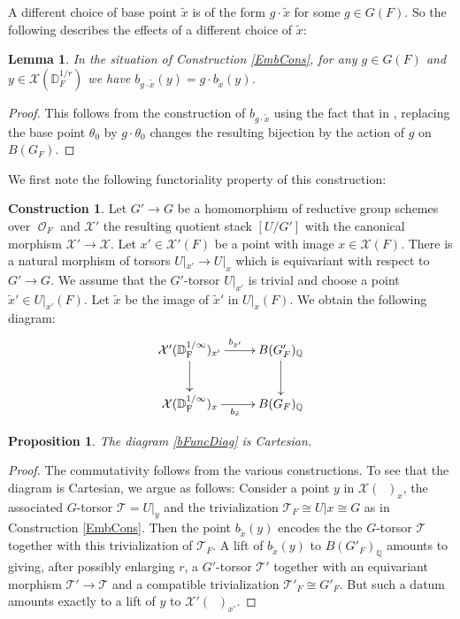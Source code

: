 \documentclass{article}
\DeclareMathOperator{\CO}{\mathcal{O}}
\DeclareMathOperator{\Qb}{\mathbb{Q}}
\newcommand{\CT}{{\mathcal T}}
\newcommand{\CX}{{\mathcal X}}
\newcommand{\Dr}[1][r]{\mathbb{D}_F^{1/#1}}
\DeclareMathOperator{\Dinfty}{\mathbb{D}_F^{1/\infty}}
\theoremstyle{definition}
\newtheorem{construction}[definition]{Construction}
\theoremstyle{plain}
\newtheorem{proposition}[definition]{Proposition}
\newtheorem{lemma}[definition]{Lemma}
\begin{document}
A different choice of base point $\tilde x$ is of the form $g\cdot \tilde x$ for some $g \in G(F)$. So the following describes the effects of a different choice of $\tilde x$:
\begin{lemma} \label{bBP}
   In the situation of Construction \ref{EmbCons}, for any $g \in G(F)$ and $y \in \CX(\Dr)$ we have $b_{g\cdot \tilde x}(y)=g\cdot b_{\tilde x}(y)$. 
\end{lemma}
\begin{proof}
    This follows from the construction of $b_{g \cdot \tilde x}$ using the fact that in \cite[Theorem 4.16]{Ziegler22}, replacing the base point $\theta_0$ by $g\cdot \theta_0$ changes the resulting bijection by the action of $g$ on $B(G_F)$.
\end{proof}
We first note the following functoriality property of this construction:
\begin{construction} \label{bFuncCons}
    Let $G' \to G$ be a homomorphism of reductive group schemes over $\CO_F$ and $\CX'$ the resulting quotient stack $[U/G']$ with the canonical morphism $\CX' \to \CX$. Let $x' \in \CX'(F)$ be a point with image $x \in \CX(F)$. There is a natural morphism of torsors $U|_{x'} \to U|_x$ which is equivariant with respect to $G' \to G$. We assume that the $G'$-torsor $U|_{x'}$ is trivial and choose a point $\tilde x' \in U|_{x'}(F)$. Let $\tilde x$ be the image of $\tilde x'$ in $U|_{x}(F)$. We obtain the following diagram:
       \begin{equation} \label{bFuncDiag}
        \xymatrix{
            \CX'(\Dinfty)_{x'} \ar[r]^{b_{\tilde x'}} \ar[d] & B(G'_F)_{\Qb} \ar[d]\\
            \CX(\Dinfty)_x \ar[r]_{b_{\tilde x}}  & B(G_F)_{\Qb}         
        }
    \end{equation}
\end{construction}
\begin{proposition} \label{bFunc}
     The diagram \eqref{bFuncDiag} is Cartesian.
\end{proposition}
\begin{proof}
    The commutativity follows from the various constructions. To see that the diagram is Cartesian, we argue as follows: Consider a point $y$ in $\CX(\Dinfty)_x$, the associated $G$-torsor $\CT=U|_y$ and the trivialization $\CT_F \cong U|x \cong G$ as in Construction \ref{EmbCons}. Then the point $b_{\tilde x}(y)$ encodes the the $G$-torsor $\CT$ together with this trivialization of $\CT_F$. A lift of $b_{\tilde x}(y)$ to $B(G'_F)_{\Qb}$ amounts to giving, after possibly enlarging $r$, a $G'$-torsor $\CT'$ together with an equivariant morphism $\CT'\to \CT$ and a compatible trivialization $\CT'_F \cong G'_F$. But such a datum amounts exactly to a lift of $y$ to $\CX'(\Dinfty)_{x'}$.
\end{proof}
\end{document}

